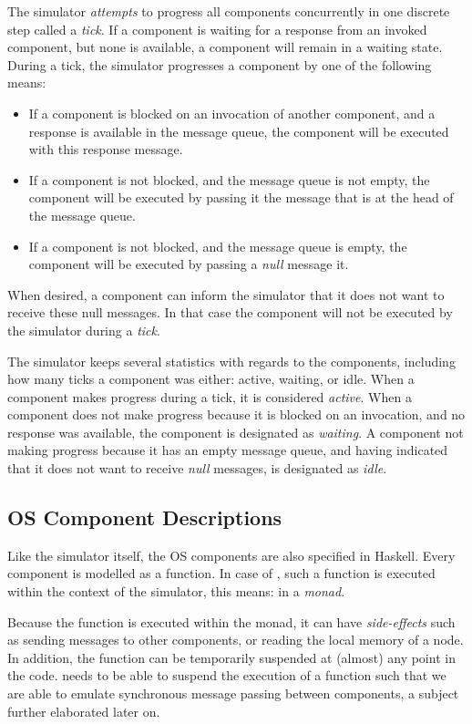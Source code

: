 The simulator \emph{attempts} to progress all components concurrently in one discrete step called a \emph{tick}.
If a component is waiting for a response from an invoked component, but none is available, a component will remain in a waiting state.
During a tick, the simulator progresses a component by one of the following means:
\begin{itemize}
  \item If a component is blocked on an invocation of another component, and a response is available in the message queue, the component will be executed with this response message.
  \item If a component is not blocked, and the message queue is not empty, the component will be executed by passing it the message that is at the head of the message queue.
  \item If a component is not blocked, and the message queue is empty, the component will be executed by passing a \emph{null} message it.
\end{itemize}
When desired, a component can inform the simulator that it does not want to receive these null messages.
In that case the component will not be executed by the simulator during a \emph{tick}.

The simulator keeps several statistics with regards to the components, including how many ticks a component was either: active, waiting, or idle.
When a component makes progress during a tick, it is considered \emph{active}.
When a component does not make progress because it is blocked on an invocation, and no response was available, the component is designated as \emph{waiting}.
A component not making progress because it has an empty message queue, and having indicated that it does not want to receive \emph{null} messages, is designated as \emph{idle}.

\subsection{OS Component Descriptions}
Like the simulator itself, the OS components are also specified in Haskell. Every component is modelled as a function.
In case of \soosim, such a function is executed within the context of the simulator, this means: in a \emph{monad}.

Because the function is executed within the monad, it can have \emph{side-effects} such as sending messages to other components, or reading the local memory of a node.
In addition, the function can be temporarily suspended at (almost) any point in the code.
\soosim needs to be able to suspend the execution of a function such that we are able to emulate synchronous message passing between components, a subject further elaborated later on.

